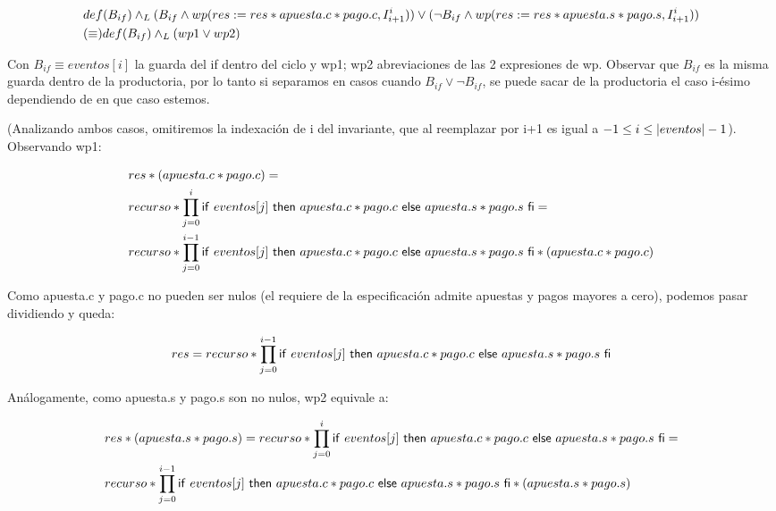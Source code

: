 \documentclass[10pt,a4paper]{article}
\begin{document}
\begin{equation}
\begin{split}
	& def(B_{if}) \land _L ( B_{if} \land wp(res:= res*apuesta.c*pago.c , I^{i}_{i+1})) \lor 
	(\neg B_{if} \land wp(res:= res*apuesta.s*pago.s , I^{i}_{i+1}))\\
	& (\equiv) def(B_{if}) \land _L (wp1 \lor wp2)
\end{split}
\end{equation}

 Con $B_{if} \equiv eventos[i]$ la guarda del if dentro del ciclo y 
 wp1; wp2 abreviaciones de las 2 expresiones de wp. 
 Observar que $B_{if}$ es la misma guarda dentro de la productoria,
 por lo tanto si separamos en casos cuando $B_{if} \lor \neg B_{if}$,
 se puede sacar de la productoria el caso i-ésimo dependiendo de en que caso estemos.

\vspace{0.3cm}
 
 (Analizando ambos casos, omitiremos la indexación de i del invariante, que al reemplazar por i+1 es igual a $-1 \leq i \leq |eventos| - 1$).
 Observando wp1:

\begin{equation}
\begin{split}
	& res * (apuesta.c * pago.c) =\\
	& recurso * \prod\limits_{j=0}^{i} \mathsf{if}\ eventos[j]\ \mathsf{then}\ apuesta.c * pago.c\ \mathsf{else}\ apuesta.s * pago.s\ \mathsf{fi} =\\
	& recurso * \prod\limits_{j=0}^{i-1} \mathsf{if}\ eventos[j]\ \mathsf{then}\ apuesta.c * pago.c\ \mathsf{else}\ apuesta.s * pago.s\ \mathsf{fi} * (apuesta.c * pago.c) 
\end{split}
\end{equation}

 Como apuesta.c y pago.c no pueden ser nulos (el requiere de la especificación admite apuestas y pagos mayores a cero), podemos pasar dividiendo y queda:

\begin{equation}
	res = recurso * \prod\limits_{j=0}^{i-1} \mathsf{if}\ eventos[j]\ \mathsf{then}\ apuesta.c * pago.c\ \mathsf{else}\ apuesta.s * pago.s\ \mathsf{fi}
\end{equation}

 Análogamente, como apuesta.s y pago.s son no nulos, wp2 equivale a:

\begin{equation}
\begin{split}
	& res * (apuesta.s * pago.s) = recurso * \prod\limits_{j=0}^{i} \mathsf{if}\ eventos[j]\ \mathsf{then}\ apuesta.c * pago.c\ \mathsf{else}\ apuesta.s * pago.s\ \mathsf{fi} =\\
	& recurso * \prod\limits_{j=0}^{i-1} \mathsf{if}\ eventos[j]\ \mathsf{then}\ apuesta.c * pago.c\ \mathsf{else}\ apuesta.s * pago.s\ \mathsf{fi} * (apuesta.s * pago.s)\\
\end{split}
\end{equation}
\end{document}
